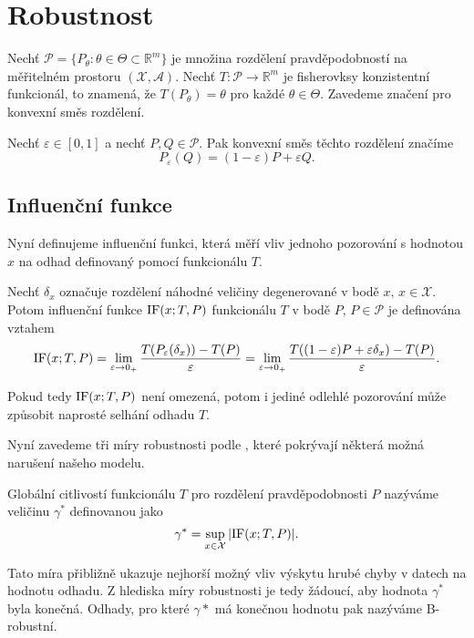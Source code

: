 \chapter{Robustnost}

Nech\v{t} $\mathcal{P} = \lbrace P_\theta : \theta \in \Theta \subset \mathbb{R}^m \rbrace$ je množina rozdělení pravděpodobností na měřitelném prostoru $\left(\mathcal{X},\mathcal{A}\right)$. Nech\v{t} $T: \mathcal{P} \rightarrow \mathbb{R}^m$ je fisherovksy konzistentní funkcionál, to znamená, že $T(P_\theta) = \theta$ pro každé $\theta \in \Theta$. Zavedeme značení pro konvexní směs rozdělení. 

\begin{definition}
	Nech\v{t} $\varepsilon \in [0,1]$ a nech\v{t} $P, Q \in \mathcal{P}$. Pak konvexní směs těchto rozdělení značíme 
	\begin{equation}
		P_\varepsilon(Q) = (1-\varepsilon)P + \varepsilon Q.
		\label{konvex-smes}
	\end{equation}
\end{definition}

\section{Influenční funkce}
\noindent
Nyní definujeme influenční funkci, která měří vliv jednoho pozorování s hodnotou $x$ na odhad definovaný pomocí funkcionálu $T$. 

\begin{definition}
	Nech\v{t} $\delta_x$ označuje rozdělení náhodné veličiny degenerované v bodě $x,\, x \in \mathcal{X}$. Potom influenční funkce $\mathrm{IF}({x};T,P)$ funkcionálu $T$ v bodě $P,\, P \in \mathcal{P}$ je definována vztahem
	\begin{equation}
		\mathrm{IF}({x};T,P) = \lim_{\varepsilon \rightarrow 0_+} \frac{T(P_\varepsilon(\delta_x)) - T(P)}{\varepsilon} = \lim_{\varepsilon \rightarrow 0_+} \frac{T((1-\varepsilon)P + \varepsilon\delta_x) - T(P)}{\varepsilon}.
	\end{equation} 
\end{definition}

\noindent
Pokud tedy $\mathrm{IF}({x};T,P)$ není omezená, potom i jediné odlehlé pozorování může způsobit naprosté selhání odhadu $T$. 

Nyní zavedeme tři míry robustnosti podle \cite{Antoch92}, které pokrývají některá možná narušení našeho modelu. 

\begin{definition}
	Globální citlivostí funkcionálu $T$ pro rozdělení pravděpodobnosti $P$ nazýváme veličinu $\gamma^*$ definovanou jako
	\begin{equation}
		\gamma^* = \sup_{x \in \mathcal{X}} |\mathrm{IF}({x};T,P)|.
	\end{equation}
\end{definition}
Tato míra přibližně ukazuje nejhorší možný vliv výskytu hrubé chyby v datech na hodnotu odhadu. Z hlediska míry robustnosti je tedy žádoucí, aby hodnota $\gamma^*$ byla konečná. Odhady, pro které $\gamma*$ má konečnou hodnotu pak nazýváme B-robustní.

